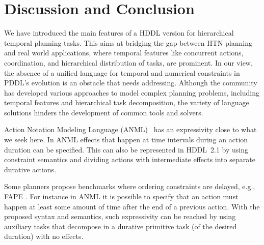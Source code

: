 \documentclass[letterpaper]{article} %
\begin{document}
\section{Discussion and Conclusion}
\label{sec:conclusion}


We have introduced the main features of a HDDL version  for hierarchical temporal planning tasks.
This aims at bridging the gap between HTN planning and real world applications, where temporal features like concurrent actions, coordination, and hierarchical distribution of tasks, are prominent.
%
In our view, the absence of a unified language for temporal and numerical constraints in PDDL's evolution is an obstacle that  needs addressing. Although the community has developed various approaches to model complex planning problems, including temporal features and hierarchical task decomposition, the variety of language solutions hinders the development of common tools and solvers.


Action Notation Modeling Language (ANML)~\citep{smith08} has an expressivity close to what we seek here.
In ANML effects that happen at time intervals during an action duration can be specified. This  can also be represented in HDDL~2.1 by using constraint semantics and dividing actions with intermediate effects into separate durative actions.

Some planners propose benchmarks where ordering constraints are delayed, e.g., FAPE \cite{dvorak2014}. %
 For instance in ANML it is possible to specify that an action must happen at least some amount of time after the end of a previous action. With the proposed syntax and semantics, such expressivity can be reached by using auxiliary tasks that decompose in a durative primitive task (of the desired duration) with no effects. %
\end{document}
